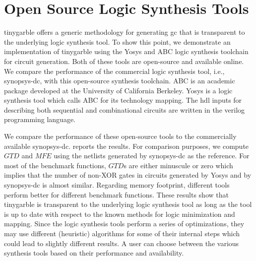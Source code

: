 \chapter{Open Source Logic Synthesis Tools}\label{chap:open-source}
\gls{tinygarble} offers a generic methodology for generating \acrfull{gc} that is transparent to the underlying logic synthesis tool.
To show this point, we demonstrate an implementation of \gls{tinygarble} using the Yosys \cite{tool:Yosys} and ABC \cite{tool:ABC} logic synthesis toolchain for circuit generation.
Both of these tools are open-source and available online.
We compare the performance of the commercial logic synthesis tool, i.e., \gls{synopsys-dc}, with this open-source synthesis toolchain.
ABC is an academic package developed at the University of California Berkeley.
Yosys is a logic synthesis tool which calls ABC for its technology mapping.
The \acrfull{hdl} inputs for describing both sequential and combinational circuits are written in the \gls{verilog} programming language.

We compare the performance of these open-source tools to the commercially available \gls{synopsys-dc}.
 reports the results.
For comparison purposes, we compute $\mathit{GTD}$ and $\mathit{MFE}$ using the \gls{netlist}s generated by \gls{synopsys-dc} as the reference.
For most of the benchmark functions, $\mathit{GTD}$s are either minuscule or zero which implies that the number of non-XOR gates in circuits generated by Yosys and by \gls{synopsys-dc} is almost similar.
Regarding memory footprint, different tools perform better for different benchmark functions.
These results show that \gls{tinygarble} is transparent to the underlying logic synthesis tool as long as the tool is up to date with respect to the known methods for logic minimization and mapping.
Since the logic synthesis tools perform a series of optimizations, they may use different (heuristic) algorithms for some of their internal steps which could lead to slightly different results.
A user can choose between the various synthesis tools based on their performance and availability.

